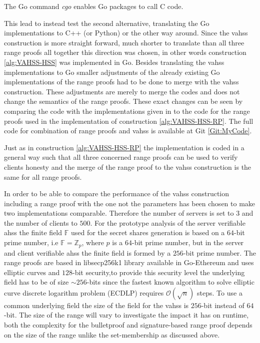 The Go command \textit{cgo} enables Go packages to call C code. 


This lead to instead test the second alternative, translating  the Go implementations to C++ (or Python) or the other way around. Since the vahss construction is more straight forward, much shorter to translate than all three range proofs all together this direction was chosen, in other words construction \ref{alg:VAHSS-HSS} was implemented in Go. Besides translating the vahss implementations to Go smaller adjustments of the already existing Go implementations of the range proofs had to be done to merge with the vahss construction. These adjustments are merely to merge the codes and does not change the semantics of the range proofs. These exact changes can be seen by comparing the code with the implementations given in \cite{Git:RP} to the code for the range proofs used in the implementation of construction \ref{alg:VAHSS-HSS-RP}. The full code for combination of range proofs and vahss is available at Git \ref{Git:MyCode}. 

Just as in construction \ref{alg:VAHSS-HSS-RP} the implementation is coded in a general way such that all three concerned range proofs can be used to verify clients honesty and the merge of the range proof to the vahss construction is the same for all range proofs. 

In order to be able to compare the performance of the vahss construction including a range proof with the one not the parameters has been chosen to make two implementations comparable. Therefore the number of servers is set to $3$ and the number of clients to $500$.  For the prototype analysis of the server verifiable ahss the finite field $\mathds{F}$ used for the secret shares generation is based on a $64$-bit prime number, i.e $\mathds{F}=\mathds{Z}_p$, where $p$ is a $64$-bit prime number,  but in the server and client verifiable ahss the finite field is formed by a $256$-bit prime number.  The range proofs are based in libsecp256k1 library available in Go-Ethereum and uses elliptic curves and $128$-bit security,to provide this security level the underlying field has to be of size $\sim 256$-bits since the fastest known algorithm to solve elliptic curve discrete logarithm problem (ECDLP) requires $\mathcal{O}(\sqrt{n})$ steps. To use a common underlying field the size of the field for the vahss is $256$-bit instead of $64$-bit.
The size of the range will vary to investigate the impact it has on runtime, both the complexity for the bulletproof and signature-based range proof depends on the size of the range  unlike the set-membership as discussed above. 

